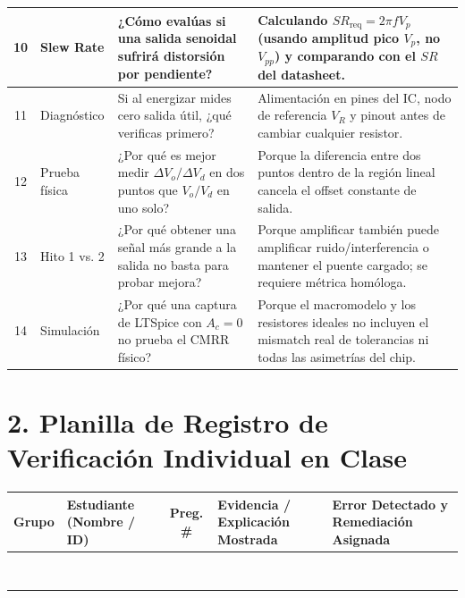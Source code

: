 \documentclass[10pt, a4paper]{article}
\begin{document}
\begin{table}[htbp]
\begin{tabularx}{\textwidth}{|c|l|>{\raggedright\arraybackslash}p{6.2cm}|>{\raggedright\arraybackslash}X|}
    10 & Slew Rate & ¿Cómo evalúas si una salida senoidal sufrirá distorsión por pendiente? & Calculando $SR_{\mathrm{req}} = 2\pi f V_p$ (usando amplitud pico $V_p$, no $V_{pp}$) y comparando con el $SR$ del datasheet. \\ \hline
    11 & Diagnóstico & Si al energizar mides cero salida útil, ¿qué verificas primero? & Alimentación en pines del IC, nodo de referencia $V_R$ y pinout antes de cambiar cualquier resistor. \\ \hline
    12 & Prueba física & ¿Por qué es mejor medir $\Delta V_o / \Delta V_d$ en dos puntos que $V_o/V_d$ en uno solo? & Porque la diferencia entre dos puntos dentro de la región lineal cancela el offset constante de salida. \\ \hline
    13 & Hito 1 vs. 2 & ¿Por qué obtener una señal más grande a la salida no basta para probar mejora? & Porque amplificar también puede amplificar ruido/interferencia o mantener el puente cargado; se requiere métrica homóloga. \\ \hline
    14 & Simulación & ¿Por qué una captura de LTSpice con $A_c=0$ no prueba el CMRR físico? & Porque el macromodelo y los resistores ideales no incluyen el mismatch real de tolerancias ni todas las asimetrías del chip. \\ \hline
    \end{tabularx}
\end{table}

\section*{2. Planilla de Registro de Verificación Individual en Clase}
\begin{table}[htbp]
    \centering
    \footnotesize
    \renewcommand{\arraystretch}{1.6}
    \begin{tabularx}{\textwidth}{|c|>{\raggedright\arraybackslash}p{4.2cm}|c|>{\raggedright\arraybackslash}X|>{\raggedright\arraybackslash}X|}
    \hline
    \rowcolor[HTML]{EFEFEF} 
    \textbf{Grupo} & \textbf{Estudiante (Nombre / ID)} & \textbf{Preg. \#} & \textbf{Evidencia / Explicación Mostrada} & \textbf{Error Detectado y Remediación Asignada} \\ \hline
    & & & & \\ \hline
    & & & & \\ \hline
    & & & & \\ \hline
    & & & & \\ \hline
    & & & & \\ \hline
    & & & & \\ \hline
    & & & & \\ \hline
    & & & & \\ \hline
    \end{tabularx}
\end{table}
\end{document}
